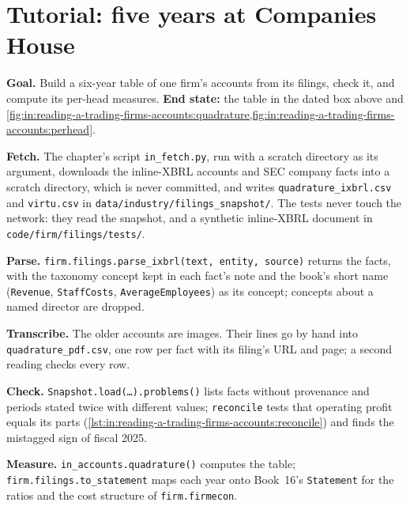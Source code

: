 \section{Tutorial: five years at Companies House}\label{tut:in:reading-a-trading-firms-accounts:tut}

\begin{tutorial}
\textbf{Goal.} Build a six-year table of one firm's accounts from its filings, check it, and compute its per-head
measures. \textbf{End state:} the table in the dated box above and
\cref{fig:in:reading-a-trading-firms-accounts:quadrature,fig:in:reading-a-trading-firms-accounts:perhead}.
\begin{tutsteps}
\item \textbf{Fetch.} The chapter's script \texttt{in\_fetch.py}, run with a scratch directory as its argument, downloads the
inline-XBRL accounts and SEC company facts into a scratch directory, which is never committed, and writes
\texttt{quadrature\_ixbrl.csv} and \texttt{virtu.csv} in \texttt{data/industry/filings\_snapshot/}. The tests never touch
the network: they read the snapshot, and a synthetic inline-XBRL document in \texttt{code/firm/filings/tests/}.
\item \textbf{Parse.} \texttt{firm.filings.parse\_ixbrl(text, entity, source)} returns the facts, with the taxonomy
concept kept in each fact's note and the book's short name (\texttt{Revenue}, \texttt{StaffCosts},
\texttt{AverageEmployees}) as its concept; concepts about a named director are dropped.
\item \textbf{Transcribe.} The older accounts are images. Their lines go by hand into
\texttt{quadrature\_pdf.csv}, one row per fact with its filing's URL and page; a second reading checks every row.
\item \textbf{Check.} \texttt{Snapshot.load(\dots).problems()} lists facts without provenance and periods stated twice
with different values; \texttt{reconcile} tests that operating profit equals its parts
(\cref{lst:in:reading-a-trading-firms-accounts:reconcile}) and finds the mistagged sign of fiscal 2025.
\label{lst:in:reading-a-trading-firms-accounts:reconcile}
\item \textbf{Measure.} \texttt{in\_accounts.quadrature()} computes the table; \texttt{firm.filings.to\_statement} maps
each year onto Book~16's \texttt{Statement} for the ratios and the cost structure of \texttt{firm.firmecon}.
\end{tutsteps}
\end{tutorial}


